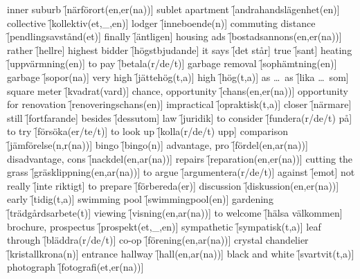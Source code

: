 \begin{questions}
\begin{multicols}{2}
        \question inner suburb \f[närförort(en,er(na))]
        \question sublet apartment \f[andrahandslägenhet(en)]
        \question collective \f[kollektiv(et,\_,en)]
        \question lodger \f[inneboende(n)]
        \question commuting distance \f[pendlingsavstånd(et)]
        \question finally \f[äntligen]
        \question housing ads \f[bostadsannons(en,er(na))]
        \question rather \f[hellre]
        \question highest bidder \f[högstbjudande]
        \question it says \f[det står]
        \question true \f[sant]
        \question heating \f[uppvärmning(en)]
        \question to pay \f[betala(r/de/t)]
        \question garbage removal \f[sophämtning(en)]
        \question garbage \f[sopor(na)]
        \question very high \f[jättehög(t,a)]
        \question high \f[hög(t,a)]
        \question as \ldots\ as \f[lika \ldots\ som]
        \question square meter \f[kvadrat(vard)]
        \question chance, opportunity \f[chans(en,er(na))]
        \question opportunity for renovation \f[renoveringschans(en)]
        \question impractical \f[opraktisk(t,a)]
        \question closer \f[närmare]
        \question still \f[fortfarande]
        \question besides \f[dessutom]
        \question law \f[juridik]
        \question to consider \f[fundera(r/de/t) på]
        \question to try \f[försöka(er/te/t)]
        \question to look up \f[kolla(r/de/t) upp]
        \question comparison \f[jämförelse(n,r(na))]
        \question bingo \f[bingo(n)]
        \question advantage, pro \f[fördel(en,ar(na))]
        \question disadvantage, cons \f[nackdel(en,ar(na))]
        \question repairs \f[reparation(en,er(na))]
        \question cutting the grass \f[gräsklippning(en,ar(na))]
        \question to argue \f[argumentera(r/de/t)]
        \question against \f[emot]
        \question not really \f[inte riktigt]
        \question to prepare \f[förbereda(er)]
        \question discussion \f[diskussion(en,er(na))]
        \question early \f[tidig(t,a)]
        \question swimming pool \f[swimmingpool(en)]
        \question gardening \f[trädgårdsarbete(t)]
        \question viewing \f[visning(en,ar(na))]
        \question to welcome \f[hälsa välkommen]
        \question brochure, prospectus \f[prospekt(et,\_,en)]
        \question sympathetic \f[sympatisk(t,a)]
        \question leaf through \f[bläddra(r/de/t)]
        \question co-op \f[förening(en,ar(na))]
        \question crystal chandelier \f[kristallkrona(n)]
        \question entrance hallway \f[hall(en,ar(na))]
        \question black and white \f[svartvit(t,a)]
        \question photograph \f[fotografi(et,er(na))]

\end{multicols}
\end{questions}
